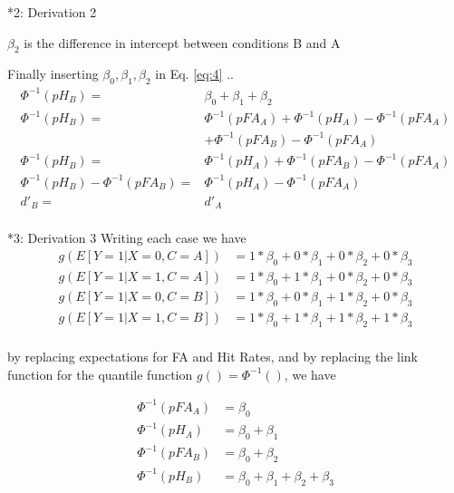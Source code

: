 \documentclass[10pt]{beamer}
\begin{document}
\begin{frame}{*2: Derivation 2}

$\beta_2$ is the difference in intercept between conditions B and A\\

\vspace{10pt}

Finally inserting $\beta_0, \beta_1, \beta_2$ in Eq. \autoref{eq:4} ..
\begin{align*}
\Phi^{-1}(pH_{B}) = & \beta_0 + \beta_1 + \beta_2\\
\Phi^{-1}(pH_{B}) = & \Phi^{-1}(pFA_{A}) + \Phi^{-1}(pH_{A}) - \Phi^{-1}(pFA_{A}) \\
& + \Phi^{-1}(pFA_{B}) - \Phi^{-1}(pFA_{A})\\
\Phi^{-1}(pH_{B}) = & \Phi^{-1}(pH_{A}) + \Phi^{-1}(pFA_{B}) - \Phi^{-1}(pFA_{A})\\
\Phi^{-1}(pH_{B}) - \Phi^{-1}(pFA_{B}) = & \Phi^{-1}(pH_{A}) - \Phi^{-1}(pFA_{A})\\
d'_B = & d'_A\\
\end{align*}
\end{frame}


\begin{frame}{*3: Derivation 3}
Writing each case we have 
\begin{align*}
g(E[Y=1| X=0, C=A]) & = 1* \beta_0 + 0 * \beta_1 + 0* \beta_2 +  0* \beta_3 \\
g(E[Y=1| X=1, C=A]) & = 1* \beta_0 + 1 * \beta_1 + 0* \beta_2 +  0* \beta_3 \\
g(E[Y=1| X=0, C=B]) & = 1* \beta_0 + 0 * \beta_1 + 1* \beta_2 +  0* \beta_3 \\
g(E[Y=1| X=1, C=B]) & = 1* \beta_0 + 1 * \beta_1 + 1* \beta_2 +  1* \beta_3 \\
\end{align*}

by replacing expectations for FA and Hit Rates, and by replacing the link function for the quantile function $g() = \Phi^{-1}()$, we have

\begin{align}
\Phi^{-1}(pFA_{A}) & = \beta_0 \label{eq:c1}\\
\Phi^{-1}(pH_{A}) & = \beta_0 + \beta_1 \label{eq:c2}\\
\Phi^{-1}(pFA_{B}) & = \beta_0 + \beta_2  \label{eq:c3}\\
\Phi^{-1}(pH_{B}) & = \beta_0 + \beta_1 + \beta_2 +  \beta_3\label{eq:c4}
\end{align}
\end{frame}
\end{document}
